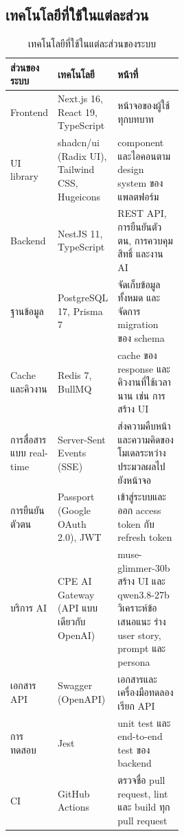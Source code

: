\subsection{เทคโนโลยีที่ใช้ในแต่ละส่วน}
\begin{table}[H]
  \centering
  \caption{เทคโนโลยีที่ใช้ในแต่ละส่วนของระบบ}
  \label{tab:tech-stack}
  \small
  \begin{tabularx}{\linewidth}{|>{\RaggedRight\arraybackslash}p{0.2\linewidth}|>{\RaggedRight\arraybackslash}p{0.3\linewidth}|>{\RaggedRight\arraybackslash}X|}
    \hline
    \textbf{ส่วนของระบบ} & \textbf{เทคโนโลยี} & \textbf{หน้าที่} \\ \hline
    Frontend & Next.js 16, React 19, TypeScript & หน้าจอของผู้ใช้ทุกบทบาท \\ \hline
    UI library & shadcn/ui (Radix UI), Tailwind CSS, Hugeicons & component และไอคอนตาม design system ของแพลตฟอร์ม \\ \hline
    Backend & NestJS 11, TypeScript & REST API, การยืนยันตัวตน, การควบคุมสิทธิ์ และงาน AI \\ \hline
    ฐานข้อมูล & PostgreSQL 17, Prisma 7 & จัดเก็บข้อมูลทั้งหมด และจัดการ migration ของ schema \\ \hline
    Cache และคิวงาน & Redis 7, BullMQ & cache ของ response และคิวงานที่ใช้เวลานาน เช่น การสร้าง UI \\ \hline
    การสื่อสารแบบ real-time & Server-Sent Events (SSE) & ส่งความคืบหน้าและความคิดของโมเดลระหว่างประมวลผลไปยังหน้าจอ \\ \hline
    การยืนยันตัวตน & Passport (Google OAuth 2.0), JWT & เข้าสู่ระบบและออก access token กับ refresh token \\ \hline
    บริการ AI & CPE AI Gateway (API แบบเดียวกับ OpenAI) & muse-glimmer-30b สร้าง UI และ qwen3.8-27b วิเคราะห์ข้อเสนอแนะ ร่าง user story, prompt และ persona \\ \hline
    เอกสาร API & Swagger (OpenAPI) & เอกสารและเครื่องมือทดลองเรียก API \\ \hline
    การทดสอบ & Jest & unit test และ end-to-end test ของ backend \\ \hline
    CI & GitHub Actions & ตรวจชื่อ pull request, lint และ build ทุก pull request \\ \hline
  \end{tabularx}
\end{table}

